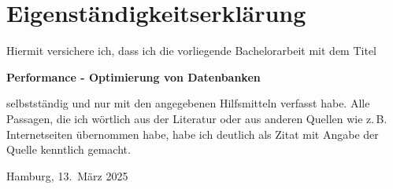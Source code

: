 
\printbibliography

\appendix



\clearpage

\thispagestyle{empty}

\section*{Eigenständigkeitserklärung}

Hiermit versichere ich, dass ich die vorliegende Bachelorarbeit mit dem Titel
\begin{center}
  \textbf{Performance - Optimierung von Datenbanken}
\end{center}
selbstständig und nur mit den angegebenen Hilfsmitteln verfasst habe.
Alle Passagen, die ich wörtlich aus der Literatur oder aus anderen Quellen wie z.\,B. Internetseiten übernommen habe, habe ich deutlich als Zitat mit Angabe der Quelle kenntlich gemacht.

\vspace{2cm}
Hamburg, 13.\ März 2025
